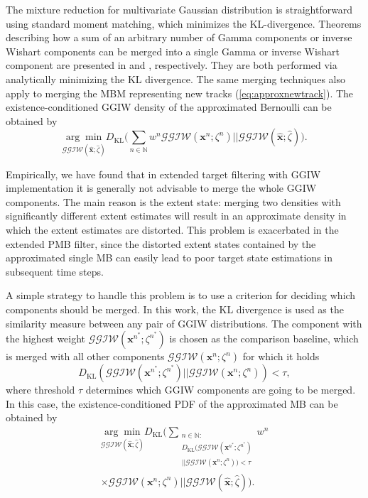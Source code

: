\documentclass[journal]{IEEEtran}
\begin{document}
The mixture reduction for multivariate Gaussian distribution is straightforward using standard moment matching, which minimizes the KL-divergence. Theorems describing how a sum of an arbitrary number of Gamma components or inverse Wishart components can be merged into a single Gamma or inverse Wishart component are presented in \cite{phdextended} and \cite{gammareduction}, respectively. They are both performed via analytically minimizing the KL divergence. The same merging techniques also apply to merging the MBM representing new tracks (\ref{eq:approxnewtrack}). The existence-conditioned GGIW density of the approximated Bernoulli can be
obtained by
\begin{equation} \underset{\mathcal{GGIW}(\hat{\mathbf{x}};\hat{\zeta})}{\arg\min}D_{\text{KL}}\bigg(\sum_{n\in\mathbb{N}}w^n\mathcal{GGIW}(\mathbf{x}^n;\zeta^n)\big|\big|\mathcal{GGIW}(\hat{\mathbf{x}};\hat{\zeta})\bigg).
\end{equation}

Empirically, we have found that in extended target filtering with GGIW implementation it is generally not advisable to merge the whole GGIW components. The main reason is the extent state: merging two densities with significantly different extent estimates will result in an approximate density in which the extent estimates are distorted. This problem is exacerbated in the extended PMB filter, since the distorted extent states contained by the approximated single MB can easily lead to poor target state estimations in subsequent time steps.

A simple strategy to handle this problem is to use a criterion for deciding which components should be merged. In this work, the KL divergence is used as the similarity measure between any pair of GGIW distributions. The component with the highest weight $\mathcal{GGIW}(\mathbf{x}^{n^*};\zeta^{n^*})$ is chosen as the comparison baseline, which is merged with all other components $\mathcal{GGIW}(\mathbf{x}^{n};\zeta^{n})$ for which it holds
\begin{equation}
    D_{\text{KL}}(\mathcal{GGIW}(\mathbf{x}^{n^*};\zeta^{n^*})||\mathcal{GGIW}(\mathbf{x}^{n};\zeta^{n})) < \tau,
\end{equation}
where threshold $\tau$ determines which GGIW components are going to be merged. 
In this case, the existence-conditioned PDF of the approximated MB can be obtained by
\begin{multline}
\underset{\mathcal{GGIW}(\hat{\mathbf{x}};\hat{\zeta})}{\arg\min}D_{\text{KL}}\Bigg(\sum_{\substack{n\in\mathbb{N}:\\D_{\text{KL}}(\mathcal{GGIW}(\mathbf{x}^{n^*};\zeta^{n^*})\\||\mathcal{GGIW}(\mathbf{x}^n;\zeta^n)) < \tau}}w^n\\\times\mathcal{GGIW}(\mathbf{x}^n;\zeta^n)\big|\big|\mathcal{GGIW}(\hat{\mathbf{x}};\hat{\zeta})\Bigg).
\end{multline}
\end{document}
